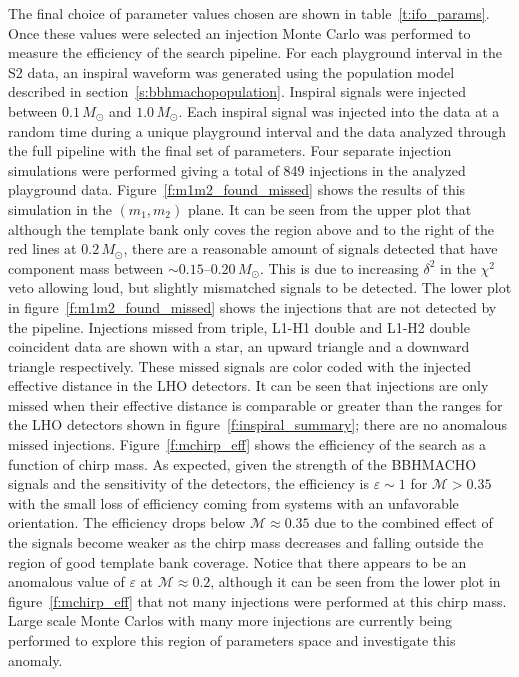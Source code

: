 The final choice of parameter values chosen are shown in
table~\ref{t:ifo_params}. Once these values were selected an injection Monte
Carlo was performed to measure the efficiency of the search pipeline. For each
playground interval in the S2 data, an inspiral waveform was generated using
the population model described in section~\ref{s:bbhmachopopulation}. Inspiral
signals were injected between $0.1\,M_\odot$ and $1.0\,M_\odot$. Each inspiral
signal was injected into the data at a random time during a unique playground
interval and the data analyzed through the full pipeline with the final set
of parameters. Four separate injection simulations were performed giving a
total of 849 injections in the analyzed playground data.
Figure~\ref{f:m1m2_found_missed} shows the results of this simulation in the
$(m_1,m_2)$ plane. It can be seen from the upper plot that although the
template bank only coves the region above and to the right of the red lines at
$0.2\,M_\odot$, there are a reasonable amount of signals detected that have
component mass between $\sim 0.15$--$0.20\,M_\odot$. This is due to increasing
$\delta^2$ in the $\chi^2$ veto allowing loud, but slightly mismatched signals
to be detected. The lower plot in figure~\ref{f:m1m2_found_missed} shows the
injections that are not detected by the pipeline. Injections missed from
triple, L1-H1 double and L1-H2 double coincident data are shown with a star,
an upward triangle and a downward triangle respectively. These missed signals
are color coded with the injected effective distance in the LHO detectors. It
can be seen that injections are only missed when their effective distance is
comparable or greater than the ranges for the LHO detectors shown in
figure~\ref{f:inspiral_summary}; there are no anomalous missed injections.
Figure~\ref{f:mchirp_eff} shows the efficiency of the search as a function of
chirp mass. As expected, given the strength of the BBHMACHO signals and the
sensitivity of the detectors, the efficiency is $\varepsilon \sim 1$ for
$\mathcal{M} >0.35$ with the small loss of efficiency coming from systems with
an unfavorable orientation. The efficiency drops below $\mathcal{M} \approx
0.35$ due to the combined effect of the signals become weaker as the chirp
mass decreases and falling outside the region of good template bank coverage.
Notice that there appears to be an anomalous value of $\varepsilon$ at
$\mathcal{M} \approx 0.2$, although it can be seen from the lower plot in
figure~\ref{f:mchirp_eff} that not many injections were performed at this
chirp mass. Large scale Monte Carlos with many more injections are currently
being performed to explore this region of parameters space and investigate
this anomaly.

